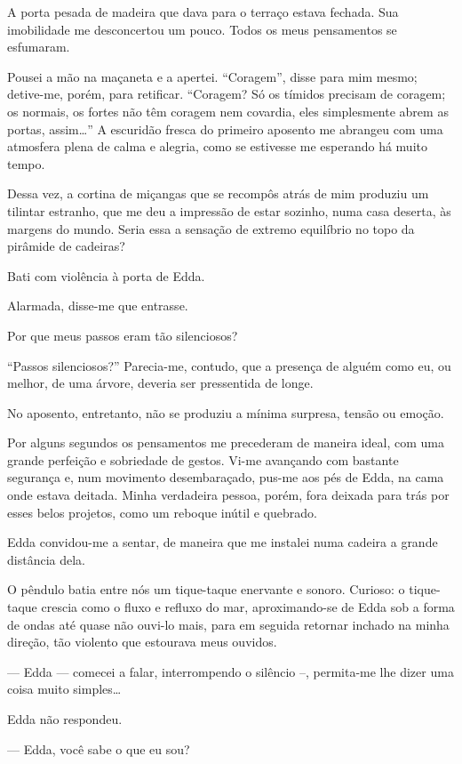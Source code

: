 A porta pesada de madeira que dava para o terraço estava fechada. Sua imobilidade me desconcertou um pouco. Todos os meus pensamentos se esfumaram.

Pousei a mão na maçaneta e a apertei. ``Coragem'', disse para mim mesmo; detive-me, porém, para retificar. ``Coragem? Só os tímidos precisam de coragem; os normais, os fortes não têm coragem nem covardia, eles simplesmente abrem as portas, assim\ldots{}''
A escuridão fresca do primeiro aposento me abrangeu com uma atmosfera plena de calma e alegria, como se estivesse me esperando há muito tempo.

Dessa vez, a cortina de miçangas que se recompôs atrás de mim produziu um tilintar estranho, que me deu a impressão de estar sozinho, numa casa deserta, às margens do mundo. Seria essa a sensação de extremo equilíbrio no topo da pirâmide de cadeiras?

Bati com violência à porta de Edda.

Alarmada, disse-me que entrasse.

Por que meus passos eram tão silenciosos?

``Passos silenciosos?'' Parecia-me, contudo, que a presença de alguém como eu, ou melhor, de uma árvore, deveria ser pressentida de longe.

No aposento, entretanto, não se produziu a mínima surpresa, tensão ou emoção.

Por alguns segundos os pensamentos me precederam de maneira ideal, com uma grande perfeição e sobriedade de gestos. Vi-me avançando com bastante segurança e, num movimento desembaraçado, pus-me aos pés de Edda, na cama onde estava deitada. Minha verdadeira pessoa, porém, fora deixada para trás por esses belos projetos, como um reboque inútil e quebrado.

Edda convidou-me a sentar, de maneira que me instalei numa cadeira a grande distância dela.

O pêndulo batia entre nós um tique-taque enervante e sonoro. Curioso: o tique-taque crescia como o fluxo e refluxo do mar, aproximando-se de Edda sob a forma de ondas até quase não ouvi-lo mais, para em seguida retornar inchado na minha direção, tão violento que estourava meus ouvidos.

--- Edda --- comecei a falar, interrompendo o silêncio --, permita-me lhe dizer uma coisa muito simples\ldots{}

Edda não respondeu.

--- Edda, você sabe o que eu sou?

